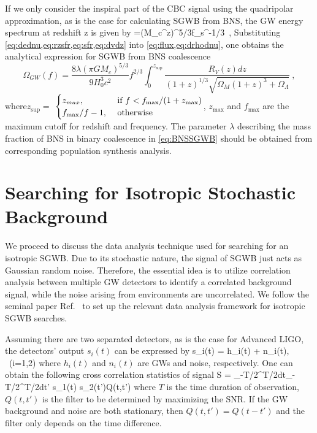 If we only consider the inspiral part of the \ac{CBC} signal using the quadripolar approximation, as is the case for calculating \ac{SGWB} from \ac{BNS}, the \ac{GW} energy spectrum at redshift z is given by
\be\label{eq:dednu}
=(M_c^z)^{5/3}f_s^{-1/3}~,
\ee
Substituting \cref{eq:dednu,eq:rzsfr,eq:sfr,eq:dvdz} into \cref{eq:flux,eq:drhodnu}, one obtains the analytical expression for \ac{SGWB} from \ac{BNS} coalescence
\begin{equation}\label{eq:BNSSGWB}
\Omega_{GW}(f)=\frac{8\lambda (\pi GM_c)^{5/3}}{9H_0^3 c^2}f^{2/3}\int ^{z_{\textrm{sup}}}_0\frac{R_V(z)dz}{(1+z)^{1/3}{\sqrt {\Omega_M(1+z)^3+\Omega_\Lambda}}}~,
\end{equation}
where$z_\text{sup}=$
$
\centering
\begin{cases}
z_{max}, &\textrm{if}~f<f_\textrm{max}/(1+z_\textrm{max}) \\
{f_\textrm{max}}/{f}-1,~&\textrm{otherwise}
\end{cases}
$,  
$z_\text{max}$ and $f_\text{max}$ are the maximum cutoff for redshift and frequency.
The parameter $\lambda$ describing the mass fraction of \ac{BNS} in binary coalescence in \cref{eq:BNSSGWB} should be obtained from corresponding population synthesis analysis.

\section{Searching for Isotropic Stochastic Background}

We proceed to discuss the data analysis technique used for searching for an isotropic \ac{SGWB}.
Due to its stochastic nature, the signal of \ac{SGWB} just acts as Gaussian random noise.
Therefore, the essential idea is to utilize correlation analysis between multiple \ac{GW} detectors to identify a correlated background signal, while the noise arising from environments are uncorrelated.
We follow the seminal paper Ref.~\cite{SGWBseminal1,SGWBseminal2} to set up the relevant data analysis framework for isotropic \ac{SGWB} searches.

Assuming there are two separated detectors, as is the case for Advanced LIGO, the detectors' output $s_i(t)$ can be expressed by
\be 
s_i(t) = h_i(t) + n_i(t), ~(i=1,2)
\ee
where $h_i(t)$ and $n_i(t)$ are \acp{GW} and noise, respectively.
One can obtain the following cross correlation statistics of signal
\be 
S = \int_{-T/2}^{T/2}dt\int_{-T/2}^{T/2}dt' s_1(t) s_2(t')Q(t,t')
\ee
where $T$ is the time duration of observation, $Q(t,t')$ is the filter to be determined by maximizing the \ac{SNR}.
If the \ac{GW} background and noise are both stationary, then $Q(t,t') = Q(t-t')$ and the filter only depends on the time difference.

